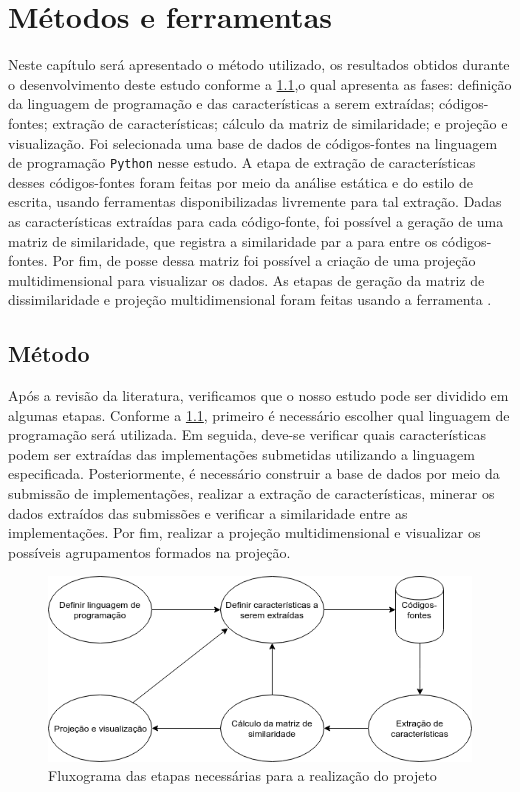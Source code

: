 \chapter{Métodos e ferramentas}
\label{chap:metodos-ferramentas}

	Neste capítulo será apresentado o método utilizado, os resultados obtidos durante   %
	o desenvolvimento deste estudo conforme a \cref{fig:fluxogramaProposta},o qual
	apresenta as fases: definição da linguagem de programação e das características
	a serem extraídas; códigos-fontes; extração de características; cálculo da matriz
	de similaridade; e projeção e visualização. Foi selecionada uma base de dados de
	códigos-fontes na linguagem de programação \texttt{Python} nesse estudo. A etapa
	de extração de características desses códigos-fontes foram feitas por meio da
	análise estática e do estilo de escrita, usando ferramentas disponibilizadas
	livremente para tal extração. Dadas as características extraídas para cada
	código-fonte, foi possível a geração de uma matriz de similaridade, que registra
	a similaridade par a para entre os códigos-fontes. Por fim, de posse dessa matriz
	foi possível a criação de uma projeção multidimensional para visualizar os dados.
	As etapas de geração da matriz de dissimilaridade e projeção multidimensional
	foram feitas usando a ferramenta .


 	\section{Método}
	 	Após a revisão da literatura, verificamos que o nosso estudo pode ser dividido
	 	em algumas etapas. Conforme a \cref{fig:fluxogramaProposta}, primeiro é necessário
	 	escolher qual linguagem de programação será utilizada. Em seguida, deve-se verificar
	 	quais características podem ser extraídas das implementações submetidas utilizando a
	 	linguagem especificada. Posteriormente, é necessário construir a base de dados por
	 	meio da submissão de implementações, realizar a extração de características, minerar
	 	os dados extraídos das submissões e verificar a similaridade entre as implementações.
	 	Por fim, realizar a projeção multidimensional e visualizar os possíveis agrupamentos
	 	formados na projeção.
	 	
	 	\begin{figure}[h]
	 		\centering
	 		\includegraphics[width=0.7\linewidth]{imagem/fluxogramaProposta}
	 		\caption{Fluxograma das etapas necessárias para a realização do projeto}
	 		\label{fig:fluxogramaProposta}
	 	\end{figure}
	 	
